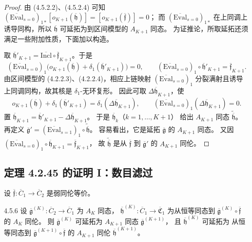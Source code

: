 \begin{proof}
由 (4.5.2.2)、(4.5.2.4) 可知
$(\overline{\mathrm{Eval}}_{s=0})_{1*}
[o_{K+1}(\overline{\mathfrak h})]
=[o_{K+1}(\overline{\mathfrak f})]=0$；
而 $(\overline{\mathrm{Eval}}_{s=0})_{1*}$
在上同调上诱导同构，所以
$\overline{\mathfrak h}$ 可延拓为到区间模型的
$A_{K+1}$ 同态。
为证推论，所取延拓还须满足一些附加性质，下面加以构造。

取
$\overline{\mathfrak h}'_{K+1}
=\overline{\mathrm{Incl}}\circ
\overline{\mathfrak f}_{K+1}$。于是
\[
 (\overline{\mathrm{Eval}}_{s=0})_1
 \bigl(o_{K+1}(\overline{\mathfrak h})
       +\delta_1(\overline{\mathfrak h}'_{K+1})\bigr)=0,
 \qquad
 (\overline{\mathrm{Eval}}_{s=0})_1
 \circ\overline{\mathfrak h}'_{K+1}
 =\overline{\mathfrak f}_{K+1}.
\]
由区间模型的 (4.2.2.3)、(4.2.2.4)，相应上链映射
$(\overline{\mathrm{Eval}}_{s=0})_1$
分裂满射且诱导上同调同构，故其核是
$\delta_1$-无环复形。
因此可取 $\Delta\overline{\mathfrak h}_{K+1}$，使
\[
 o_{K+1}(\overline{\mathfrak h})
 +\delta_1(\overline{\mathfrak h}'_{K+1})
 =\delta_1(\Delta\overline{\mathfrak h}_{K+1}),
 \qquad
 (\overline{\mathrm{Eval}}_{s=0})_1
 (\Delta\overline{\mathfrak h}_{K+1})=0.
\]
置
$\overline{\mathfrak h}_{K+1}
=\overline{\mathfrak h}'_{K+1}
-\Delta\overline{\mathfrak h}_{K+1}$。
于是 $\overline{\mathfrak h}_k$（$k=1,\ldots,K+1$）
给出 $A_{K+1}$ 同态
$\widetilde{\overline{\mathfrak h}}$。
再定义
$\overline{\mathfrak g}'
=(\overline{\mathrm{Eval}}_{s=1})_1
\circ\widetilde{\overline{\mathfrak h}}$。
容易看出，它是延拓
$\overline{\mathfrak g}$ 的 $A_{K+1}$ 同态。
又因
$(\overline{\mathrm{Eval}}_{s=0})_1
\circ\overline{\mathfrak h}_{K+1}
=\overline{\mathfrak f}_{K+1}$，
故 $\widetilde{\overline{\mathfrak h}}$
是从 $\overline{\mathfrak f}$ 到
$\overline{\mathfrak g}'$ 的 $A_{K+1}$ 同伦。
\end{proof}
\subsection{定理 4.2.45 的证明 I：数目滤过}
\label{subsec:4-5-2}

设 $\overline{\mathfrak f}\colon\overline C_1\to\overline C_2$
是弱同伦等价。

\begin{proposition}{4.5.6}\label{prop:4-5-6}
设
$\overline{\mathfrak g}^{(K)}\colon
\overline C_2\to\overline C_1$
为 $A_K$ 同态，
$\overline{\mathfrak h}^{(K)}\colon
\overline C_1\to\overline{\mathfrak C}_1$
为从恒等同态到
$\overline{\mathfrak g}^{(K)}
\circ\overline{\mathfrak f}$ 的 $A_K$ 同伦。
则 $\overline{\mathfrak g}^{(K)}$ 可延拓为
$A_{K+1}$ 同态 $\overline{\mathfrak g}^{(K+1)}$，
且 $\overline{\mathfrak h}^{(K)}$ 可延拓为
从恒等同态到
$\overline{\mathfrak g}^{(K+1)}
\circ\overline{\mathfrak f}$ 的 $A_{K+1}$ 同伦
$\overline{\mathfrak h}^{(K+1)}$。
\end{proposition}

